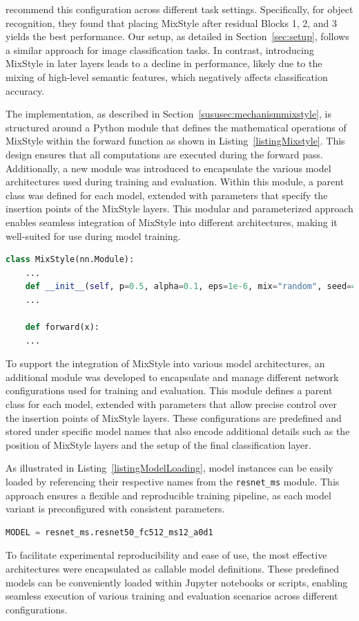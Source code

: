 \cite{mixstyle_ref} recommend this configuration across different task settings. Specifically, for object recognition, they found that placing MixStyle after residual Blocks 1, 2, and 3 yields the best performance. Our setup, as detailed in Section~\ref{sec:setup}, follows a similar approach for image classification tasks. In contrast, introducing MixStyle in later layers leads to a decline in performance, likely due to the mixing of high-level semantic features, which negatively affects classification accuracy.

The implementation, as described in Section~\ref{sususec:mechanismmixstyle}, is structured around a Python module that defines the mathematical operations of MixStyle within the forward function as shown in Listing~\ref{listingMixstyle}. This design ensures that all computations are executed during the forward pass. Additionally, a new module was introduced to encapsulate the various model architectures used during training and evaluation. Within this module, a parent class was defined for each model, extended with parameters that specify the insertion points of the MixStyle layers. This modular and parameterized approach enables seamless integration of MixStyle into different architectures, making it well-suited for use during model training.

\begin{lstlisting}[language=Python, caption={MixStyle implementation structure}, label=listingMixstyle]
class MixStyle(nn.Module):
	...
	def __init__(self, p=0.5, alpha=0.1, eps=1e-6, mix="random", seed=42):
	...
	
	def forward(x):
	...
\end{lstlisting}

To support the integration of MixStyle into various model architectures, an additional module was developed to encapsulate and manage different network configurations used for training and evaluation. This module defines a parent class for each model, extended with parameters that allow precise control over the insertion points of MixStyle layers. These configurations are predefined and stored under specific model names that also encode additional details such as the position of MixStyle layers and the setup of the final classification layer.

As illustrated in Listing~\ref{listingModelLoading}, model instances can be easily loaded by referencing their respective names from the \texttt{resnet\_ms} module. This approach ensures a flexible and reproducible training pipeline, as each model variant is preconfigured with consistent parameters.

\begin{lstlisting}[language=Python, caption={Model loading from predefined configurations}, label=listingModelLoading]
	MODEL = resnet_ms.resnet50_fc512_ms12_a0d1
\end{lstlisting}

To facilitate experimental reproducibility and ease of use, the most effective architectures were encapsulated as callable model definitions. These predefined models can be conveniently loaded within Jupyter notebooks or scripts, enabling seamless execution of various training and evaluation scenarios across different configurations. 
